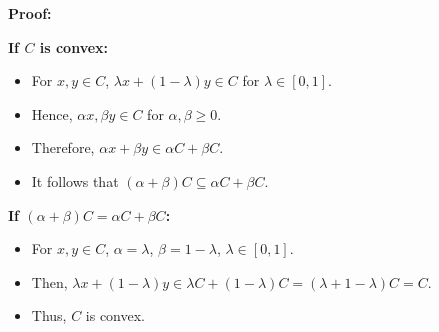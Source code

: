 \documentclass{exam}
\begin{document}
\begin{questions}

\textbf{Proof:}

\textbf{If \( C \) is convex:}
\begin{itemize}
    \item For \( x, y \in C \), \( \lambda x + (1-\lambda)y \in C \) for \( \lambda \in [0,1] \).
    \item Hence, \( \alpha x, \beta y \in C \) for \( \alpha, \beta \geq 0 \).
    \item Therefore, \( \alpha x + \beta y \in \alpha C + \beta C \).
    \item It follows that \( (\alpha + \beta)C \subseteq \alpha C + \beta C \).
\end{itemize}

\textbf{If \( (\alpha + \beta)C = \alpha C + \beta C \):}
\begin{itemize}
    \item For \( x, y \in C \), \( \alpha = \lambda \), \( \beta = 1-\lambda \), \( \lambda \in [0,1] \).
    \item Then, \( \lambda x + (1-\lambda)y \in \lambda C + (1-\lambda)C = (\lambda + 1 - \lambda)C = C \).
    \item Thus, \( C \) is convex.
\end{itemize}

\end{questions}
\end{document}
